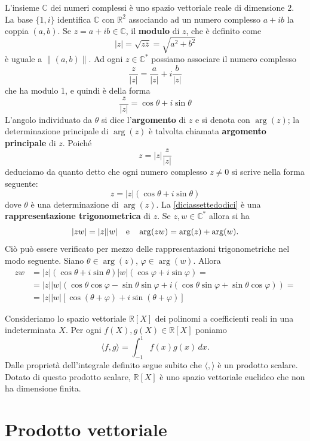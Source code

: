 \documentclass{article}
\theoremstyle{plain}
\theoremstyle{definition}
\theoremstyle{remark}
\begin{document}
L'insieme $\mathbb{C}$ dei numeri complessi è uno spazio vettoriale reale di dimensione $2$. La base $\{1, i\}$ 
identifica $\mathbb{C}$ con $\mathbb{R}^2$ associando ad un numero complesso $a + ib$ la coppia $(a, b)$. 
Se $z = a + ib \in \mathbb{C}$, il \textbf{modulo} di $z$, che è definito come
\[|z| = \sqrt{z\bar{z}} = \sqrt{a^2 + b^2}\]
è uguale a $\|(a, b)\|$. Ad ogni $z \in \mathbb{C}^*$ possiamo associare il numero complesso
\[\frac{z}{|z|} = \frac{a}{|z|} + i\frac{b}{|z|}\]
che ha modulo 1, e quindi è della forma
\[\frac{z}{|z|} = \cos\theta + i\sin\theta\]
L'angolo individuato da $\theta$ si dice l'\textbf{argomento} di $z$ e si denota con $\arg(z)$; 
la determinazione principale di $\arg(z)$ è talvolta chiamata \textbf{argomento principale} di $z$.
Poiché 
\[z = |z| \frac{z}{|z|}\]
deduciamo da quanto detto che ogni numero complesso $z \neq 0$ si scrive nella forma seguente:
\begin{equation}\label{diciassettedodici}
z = |z|(\cos\theta + i\sin\theta)
\end{equation}
dove $\theta$ è una determinazione di $\arg(z)$. La \ref{diciassettedodici} è una 
\textbf{rappresentazione trigonometrica} di $z$.
Se $z, w \in \mathbb{C}^*$ allora si ha 
\[|zw| = |z||w|\quad\textup{e}\quad\arg(zw) = \arg(z) + \arg(w).\]
Ciò può essere verificato per mezzo delle rappresentazioni trigonometriche nel modo seguente. 
Siano $\theta \in \arg(z)$, $\varphi \in \arg(w)$. Allora
\begin{align*}
zw &= |z|(\cos\theta + i\sin\theta)|w|(\cos\varphi + i\sin\varphi) = \\
&= |z||w|(\cos\theta\cos\varphi - \sin\theta\sin\varphi + i(\cos\theta\sin\varphi + \sin\theta\cos\varphi)) = \\
&= |z||w|[\cos(\theta + \varphi) + i\sin(\theta + \varphi)]
\end{align*}

\vspace{10pt}

Consideriamo lo spazio vettoriale $\mathbb{R}[X]$ dei polinomi a coefficienti reali in una indeterminata $X$. 
Per ogni $f(X), g(X) \in \mathbb{R}[X]$ poniamo
\[\langle f, g \rangle = \int_{-1}^{1} f(x)g(x) \,dx.\]
Dalle proprietà dell'integrale definito segue subito che $\langle , \rangle$ è un prodotto scalare. 
Dotato di questo prodotto scalare, $\mathbb{R}[X]$ è uno spazio vettoriale euclideo che non ha dimensione finita.

\newpage
\section{Prodotto vettoriale}
\vspace{20pt}
\end{document}
